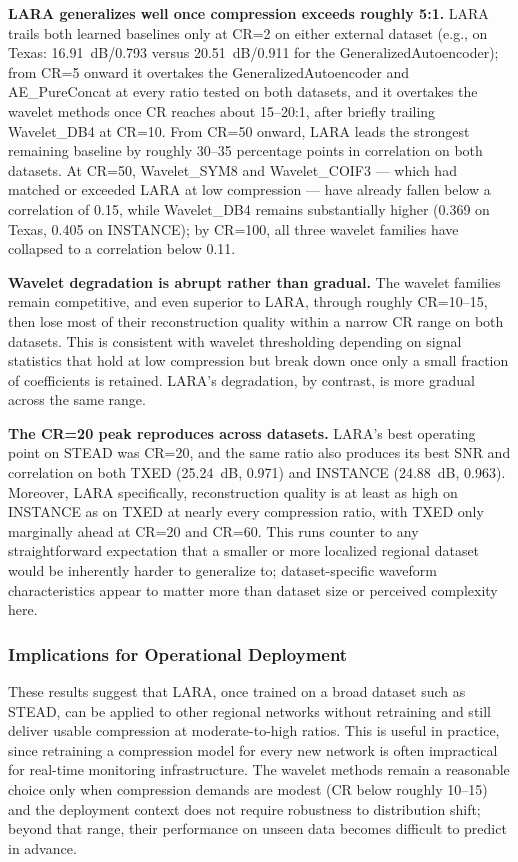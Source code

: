 \documentclass[fleqn,10pt]{wlscirep}
\begin{document}
\textbf{LARA generalizes well once compression exceeds roughly 5:1.} LARA trails both learned baselines only at CR=2 on either external dataset (e.g., on Texas: 16.91~dB/0.793 versus 20.51~dB/0.911 for the GeneralizedAutoencoder); from CR=5 onward it overtakes the GeneralizedAutoencoder and AE\_PureConcat at every ratio tested on both datasets, and it overtakes the wavelet methods once CR reaches about 15--20:1, after briefly trailing Wavelet\_DB4 at CR=10. From CR=50 onward, LARA leads the strongest remaining baseline by roughly 30--35 percentage points in correlation on both datasets. At CR=50, Wavelet\_SYM8 and Wavelet\_COIF3 --- which had matched or exceeded LARA at low compression --- have already fallen below a correlation of 0.15, while Wavelet\_DB4 remains substantially higher (0.369 on Texas, 0.405 on INSTANCE); by CR=100, all three wavelet families have collapsed to a correlation below 0.11.

\textbf{Wavelet degradation is abrupt rather than gradual.} The wavelet families remain competitive, and even superior to LARA, through roughly CR=10--15, then lose most of their reconstruction quality within a narrow CR range on both datasets. This is consistent with wavelet thresholding depending on signal statistics that hold at low compression but break down once only a small fraction of coefficients is retained. LARA's degradation, by contrast, is more gradual across the same range.

\textbf{The CR=20 peak reproduces across datasets.} LARA's best operating point on STEAD was CR=20, and the same ratio also produces its best SNR and correlation on both TXED (25.24~dB, 0.971) and INSTANCE (24.88~dB, 0.963). 
Moreover, LARA specifically, reconstruction quality is at least as high on INSTANCE as on TXED at nearly every compression ratio, with TXED only marginally ahead at CR=20 and CR=60. This runs counter to any straightforward expectation that a smaller or more localized regional dataset would be inherently harder to generalize to; dataset-specific waveform characteristics appear to matter more than dataset size or perceived complexity here.

\subsubsection{Implications for Operational Deployment}

These results suggest that LARA, once trained on a broad dataset such as STEAD, can be applied to other regional networks without retraining and still deliver usable compression at moderate-to-high ratios. This is useful in practice, since retraining a compression model for every new network is often impractical for real-time monitoring infrastructure. The wavelet methods remain a reasonable choice only when compression demands are modest (CR below roughly 10--15) and the deployment context does not require robustness to distribution shift; beyond that range, their performance on unseen data becomes difficult to predict in advance.
\end{document}
